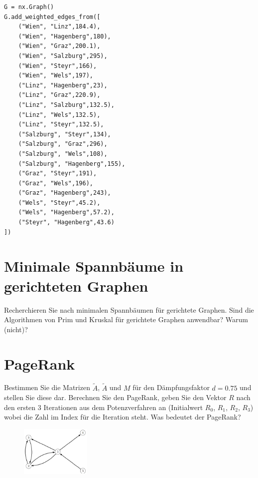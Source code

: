 \documentclass[a4paper,11pt]{report}
\begin{document}
    \begin{verbatim}
G = nx.Graph()
G.add_weighted_edges_from([
    ("Wien", "Linz",184.4),
    ("Wien", "Hagenberg",180),
    ("Wien", "Graz",200.1),
    ("Wien", "Salzburg",295),
    ("Wien", "Steyr",166),
    ("Wien", "Wels",197),
    ("Linz", "Hagenberg",23),
    ("Linz", "Graz",220.9),
    ("Linz", "Salzburg",132.5),
    ("Linz", "Wels",132.5),
    ("Linz", "Steyr",132.5),
    ("Salzburg", "Steyr",134),
    ("Salzburg", "Graz",296),
    ("Salzburg", "Wels",108),
    ("Salzburg", "Hagenberg",155),
    ("Graz", "Steyr",191),
    ("Graz", "Wels",196),
    ("Graz", "Hagenberg",243),
    ("Wels", "Steyr",45.2),
    ("Wels", "Hagenberg",57.2),
    ("Steyr", "Hagenberg",43.6)
])
    \end{verbatim}

    \newpage

    \chapter{Minimale Spannbäume in gerichteten Graphen}
    \label{ch:minSbDiGraph}
    Recherchieren Sie nach minimalen Spannbäumen für gerichtete Graphen.
    Sind die Algorithmen von Prim und Kruskal für gerichtete Graphen anwendbar?
    Warum (nicht)?

    \newpage

    \chapter{PageRank}
    \label{ch:pageRank}
    Bestimmen Sie die Matrizen $\widetilde{A}$, $\widetilde{A}$ und $M$ für den Dämpfungsfaktor $d = 0.75$ und stellen Sie diese dar.
    Berechnen Sie den PageRank, geben Sie den Vektor $R$ nach den ersten $3$ Iterationen aus dem Potenzverfahren an (Initialwert $R_0$, $R_1$, $R_2$, $R_3$) wobei die Zahl im Index für die Iteration steht.
    Was bedeutet der PageRank?

    \begin{figure}[H]
        \includegraphics[width=0.3\textwidth]{a06a_graph}
        \label{fig:a06_graph}
    \end{figure}
\end{document}
